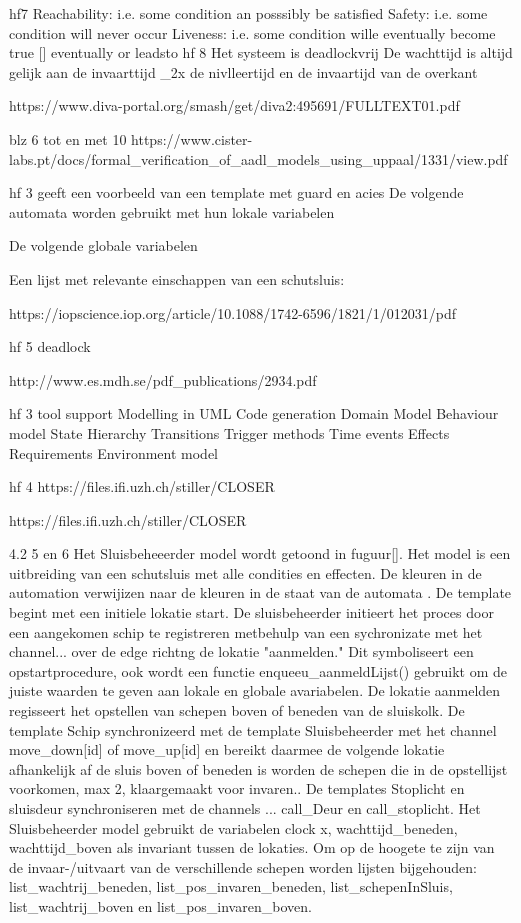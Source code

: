 hf7
Reachability: i.e. some condition an posssibly be satisfied
Safety: i.e. some condition will never occur
Liveness: i.e. some condition wille eventually become true [] eventually or leadsto
hf 8
Het systeem is deadlockvrij
De wachttijd is altijd gelijk aan de invaarttijd _2x de nivlleertijd en de invaartijd van de overkant

https://www.diva-portal.org/smash/get/diva2:495691/FULLTEXT01.pdf

blz 6 tot en met 10
https://www.cister-labs.pt/docs/formal_verification_of_aadl_models_using_uppaal/1331/view.pdf

hf 3 geeft een voorbeeld van een template met guard en acies
De volgende automata worden gebruikt met hun lokale variabelen

De volgende globale variabelen

Een lijst met relevante einschappen van een schutsluis:

https://iopscience.iop.org/article/10.1088/1742-6596/1821/1/012031/pdf

hf 5
deadlock

http://www.es.mdh.se/pdf_publications/2934.pdf

hf 3 tool support
Modelling in UML
Code generation
Domain Model
Behaviour model
State Hierarchy
Transitions
Trigger methods
Time events
Effects
Requirements
Environment model

hf 4
https://files.ifi.uzh.ch/stiller/CLOSER%


https://files.ifi.uzh.ch/stiller/CLOSER%

4.2 5 en 6
Het Sluisbeheeerder model wordt getoond in fuguur[]. Het model is een uitbreiding van een schutsluis met alle condities en effecten. De kleuren in de automation verwijizen naar de kleuren in de staat van de automata . De template begint met een initiele lokatie start. De sluisbeheerder initieert het proces door een aangekomen schip te registreren metbehulp van een sychronizate met het channel... over de edge richtng de lokatie "aanmelden." Dit symboliseert een opstartprocedure, ook wordt een functie enqueeu_aanmeldLijst() gebruikt om de juiste waarden te geven aan lokale en globale avariabelen. De lokatie aanmelden regisseert het opstellen van schepen boven of beneden van de sluiskolk. De template Schip synchronizeerd met de template Sluisbeheerder met het channel move_down[id] of move_up[id] en bereikt daarmee de volgende lokatie afhankelijk af de sluis boven of beneden is worden de schepen die in de opstellijst voorkomen, max 2, klaargemaakt voor invaren.. De templates Stoplicht en sluisdeur synchroniseren met de channels ... call_Deur en call_stoplicht.
Het Sluisbeheerder model gebruikt de variabelen clock x, wachttijd_beneden, wachttijd_boven als invariant tussen de lokaties. Om op de hoogete te zijn van de invaar-/uitvaart van de verschillende schepen worden lijsten bijgehouden: list_wachtrij_beneden, list_pos_invaren_beneden, list_schepenInSluis, list_wachtrij_boven en list_pos_invaren_boven.

